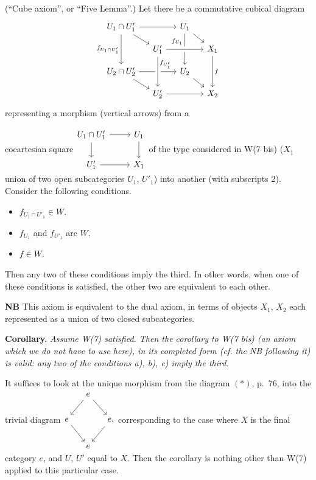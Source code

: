 \documentclass[11pt]{article}
\newcommand{\msp}[1]{\marginpar{\footnotesize [#1]}}
\begin{document}
\begin{description}[leftmargin=5em, style=sameline]
\item[W(7)] (``Cube axiom'', or ``Five Lemma''.) Let there be a commutative cubical diagram
\[
\begin{tikzcd}[row sep=small, column sep=small]
U_1\cap U'_1 \arrow[rr] \arrow[dr] \arrow[dd, "f_{U_1\cap U'_1}"'] & & U_1 \arrow[dr] \arrow[dd, "f_{U_1}"{swap,pos=.25}] & \\
& U'_1 \arrow[rr, crossing over] & & X_1 \arrow[dd, "f"] \\
U_2\cap U'_2 \arrow[rr] \arrow[dr] & & U_2 \arrow[dr] & \\
& U'_2 \arrow[rr] \arrow[from=uu, crossing over, "f_{U'_1}"{pos=.25}] & & X_2
\end{tikzcd}
\]
representing a morphism (vertical arrows) from a

\msp{page 77}
cocartesian square\quad $\vcenter{\hbox{\begin{tikzcd}
U_1\cap U'_1 \arrow[r] \arrow[d] & U_1 \arrow[d] \\
U'_1 \arrow[r] & X_1
\end{tikzcd}}}$\quad of the type considered in W(7 bis) ($X_1$ union of two open subcategories $U_1$, $U'_1$) into another (with subscripts 2). Consider the following conditions.

\begin{itemize}
\item[a)] $f_{U_1\cap U'_1}\in W$.
\item[b)] $f_{U_1}$ and $f_{U'_1}$ are $W$.
\item[c)] $f\in W$.
\end{itemize}

Then any two of these conditions imply the third. In other words, when one of these conditions is satisfied, the other two are equivalent to each other.
\end{description}

\textbf{NB} This axiom is equivalent to the dual axiom, in terms of objects $X_1$, $X_2$ each represented as a union of two closed subcategories.

\textbf{Corollary.} \textit{Assume \textup{W(7)} satisfied. Then the corollary to \textup{W(7 bis)} (an axiom which we do not have to use here), in its completed form (cf. the NB following it) is valid: any two of the conditions a), b), c) imply the third.}

It suffices to look at the unique morphism from the diagram $(*)$, p.~76, into the trivial diagram\quad $\vcenter{\hbox{\begin{tikzcd}[column sep=small]
& e \arrow[dl] \arrow[dr] & \\
e \arrow[dr] & & e, \arrow[dl] \\
& e &
\end{tikzcd}}}$\quad corresponding to the case where $X$ is the final category $e$, and $U$, $U'$ equal to $X$. Then the corollary is nothing other than W(7) applied to this particular case.
\end{document}
